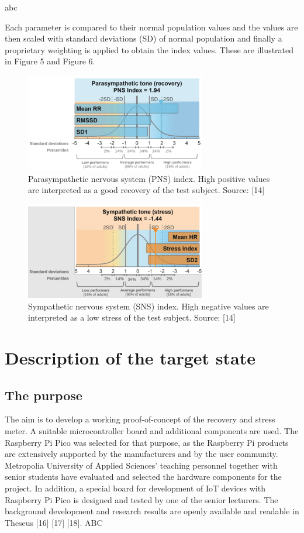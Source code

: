 \documentclass{article}
\begin{document}
abc

Each parameter is compared to their normal population values and the values are then
scaled with standard deviations (SD) of normal population and finally a proprietary weighting
is applied to obtain the index values. These are illustrated in Figure 5 and Figure 6.


\begin{figure}[h]
  \centering
  \includegraphics[width=0.7\textwidth]{parasympathetic.png}
  \caption{Parasympathetic nervous system (PNS) index. High positive values are interpreted as a good recovery
of the test subject. Source: [14]}
  \label{harrin}
\end{figure}

\begin{figure}[h]
  \centering
  \includegraphics[width=0.7\textwidth]{sympathetic2.png}
  \caption{Sympathetic nervous system (SNS) index. High negative values are interpreted as a low stress of the
test subject. Source: [14]}
  \label{harrin}
\end{figure}

\section{Description of the target state}

\subsection{The purpose}
The aim is to develop a working proof-of-concept of the recovery and stress meter. A
suitable microcontroller board and additional components are used. The Raspberry Pi Pico
was selected for that purpose, as the Raspberry Pi products are extensively supported by
the manufacturers and by the user community.
Metropolia University of Applied Sciences’ teaching personnel together with senior students
have evaluated and selected the hardware components for the project. In addition, a special
board for development of IoT devices with Raspberry Pi Pico is designed and tested by one
of the senior lecturers. The background development and research results are openly
available and readable in Theseus [16] [17] [18].
ABC
\end{document}
